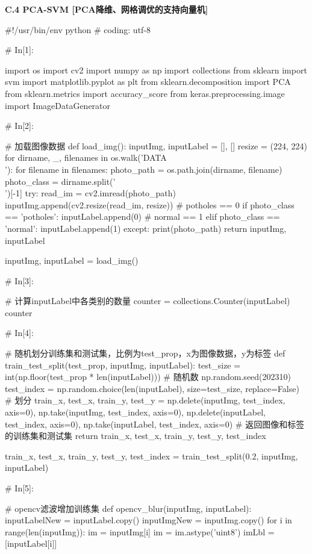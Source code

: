 \documentclass{MathorCupmodeling}
\begin{document}
\textbf{C.4 PCA-SVM [PCA降维、网格调优的支持向量机]}
\begin{python}
#!/usr/bin/env python
# coding: utf-8

# In[1]:


import os
import cv2
import numpy as np
import collections
from sklearn import svm
import matplotlib.pyplot as plt
from sklearn.decomposition import PCA
from sklearn.metrics import accuracy_score
from keras.preprocessing.image import ImageDataGenerator


# In[2]:


# 加载图像数据
def load_img():
    inputImg, inputLabel = [], []
    resize = (224, 224)
    for dirname, _, filenames in os.walk('DATA\\'):
        for filename in filenames:
            photo_path = os.path.join(dirname, filename)
            photo_class = dirname.split('\\')[-1]
            try:
                read_im = cv2.imread(photo_path)
                inputImg.append(cv2.resize(read_im, resize))
                # potholes == 0
                if photo_class == 'potholes':
                    inputLabel.append(0)
                # normal == 1
                elif photo_class == 'normal':
                    inputLabel.append(1)
            except:
                print(photo_path)
    return inputImg, inputLabel


inputImg, inputLabel = load_img()

# In[3]:


# 计算inputLabel中各类别的数量
counter = collections.Counter(inputLabel)
counter


# In[4]:


# 随机划分训练集和测试集，比例为test_prop，x为图像数据，y为标签
def train_test_split(test_prop, inputImg, inputLabel):
    test_size = int(np.floor(test_prop * len(inputLabel)))
    # 随机数
    np.random.seed(202310)
    test_index = np.random.choice(len(inputLabel), size=test_size, replace=False)
    # 划分
    train_x, test_x, train_y, test_y = np.delete(inputImg, test_index, axis=0), np.take(inputImg, test_index, axis=0), np.delete(inputLabel, test_index, axis=0), np.take(inputLabel, test_index, axis=0)
    # 返回图像和标签的训练集和测试集
    return train_x, test_x, train_y, test_y, test_index


train_x, test_x, train_y, test_y, test_index = train_test_split(0.2, inputImg, inputLabel)


# In[5]:


# opencv滤波增加训练集
def opencv_blur(inputImg, inputLabel):
    inputLabelNew = inputLabel.copy()
    inputImgNew = inputImg.copy()
    for i in range(len(inputImg)):
        im = inputImg[i]
        im = im.astype('uint8')
        imLbl = [inputLabel[i]]


\end{python}
\end{document}
